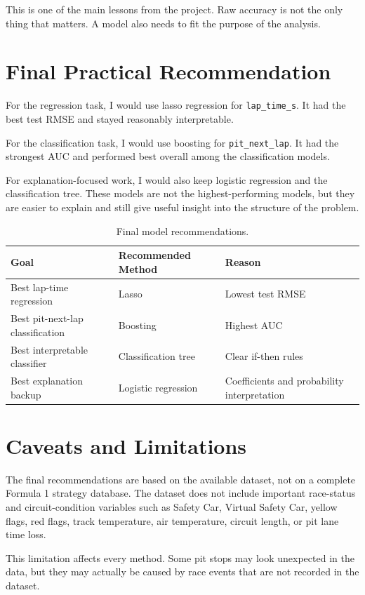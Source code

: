 \documentclass[11pt,oneside,openany]{book}
\begin{document}
This is one of the main lessons from the project. Raw accuracy is not the only thing that matters. A model also needs to fit the purpose of the analysis.

\section{Final Practical Recommendation}

For the regression task, I would use lasso regression for \texttt{lap\_time\_s}. It had the best test RMSE and stayed reasonably interpretable.

For the classification task, I would use boosting for \texttt{pit\_next\_lap}. It had the strongest AUC and performed best overall among the classification models.

For explanation-focused work, I would also keep logistic regression and the classification tree. These models are not the highest-performing models, but they are easier to explain and still give useful insight into the structure of the problem.

\begin{table}[H]
\centering
\small
\caption{Final model recommendations.}
\begin{tabular}{lll}
\toprule
Goal & Recommended Method & Reason\\
\midrule
Best lap-time regression & Lasso & Lowest test RMSE\\
Best pit-next-lap classification & Boosting & Highest AUC\\
Best interpretable classifier & Classification tree & Clear if-then rules\\
Best explanation backup & Logistic regression & Coefficients and probability interpretation\\
\bottomrule
\end{tabular}
\end{table}

\section{Caveats and Limitations}

The final recommendations are based on the available dataset, not on a complete Formula 1 strategy database. The dataset does not include important race-status and circuit-condition variables such as Safety Car, Virtual Safety Car, yellow flags, red flags, track temperature, air temperature, circuit length, or pit lane time loss.

This limitation affects every method. Some pit stops may look unexpected in the data, but they may actually be caused by race events that are not recorded in the dataset.
\end{document}
